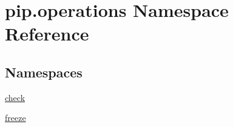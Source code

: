 \hypertarget{namespacepip_1_1operations}{}\section{pip.\+operations Namespace Reference}
\label{namespacepip_1_1operations}
\subsection*{Namespaces}
\begin{DoxyCompactItemize}
\item 
 \hyperlink{namespacepip_1_1operations_1_1check}{check}
\item 
 \hyperlink{namespacepip_1_1operations_1_1freeze}{freeze}
\end{DoxyCompactItemize}
